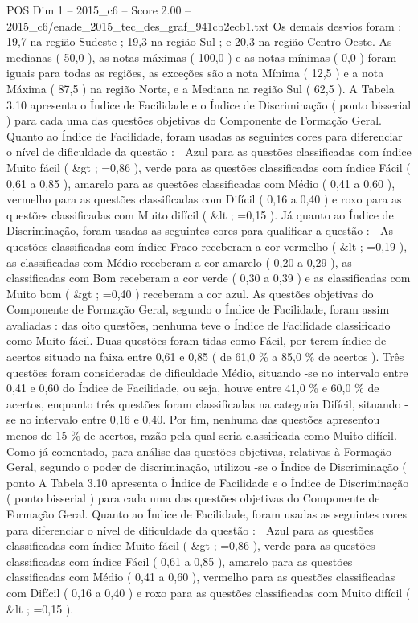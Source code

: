 \begin{textsample}{POS Dim 1 – 2015\_c6 – Score 2.00 – 2015\_c6/enade\_2015\_tec\_des\_graf\_941cb2ecb1.txt}
Os demais desvios foram : 19,7 na região Sudeste ; 19,3 na região Sul ; e 20,3 na região Centro-Oeste.
As medianas ( 50,0 ), as notas máximas ( 100,0 ) e as notas mínimas ( 0,0 ) foram iguais para todas as regiões, as exceções são a nota Mínima ( 12,5 ) e a nota Máxima ( 87,5 ) na região Norte, e a Mediana na região Sul ( 62,5 ).
A Tabela 3.10 apresenta o Índice de Facilidade e o Índice de Discriminação ( ponto bisserial ) para cada uma das questões objetivas do Componente de Formação Geral.
Quanto ao Índice de Facilidade, foram usadas as seguintes cores para diferenciar o nível de dificuldade da questão :  Azul para as questões classificadas com índice Muito fácil ( \&gt ; =0,86 ), verde para as questões classificadas com índice Fácil ( 0,61 a 0,85 ), amarelo para as questões classificadas com Médio ( 0,41 a 0,60 ), vermelho para as questões classificadas com Difícil ( 0,16 a 0,40 ) e roxo para as questões classificadas com Muito difícil ( \&lt ; =0,15 ).
Já quanto ao Índice de Discriminação, foram usadas as seguintes cores para qualificar a questão :  As questões classificadas com índice Fraco receberam a cor vermelho ( \&lt ; =0,19 ), as classificadas com Médio receberam a cor amarelo ( 0,20 a 0,29 ), as classificadas com Bom receberam a cor verde ( 0,30 a 0,39 ) e as classificadas com Muito bom ( \&gt ; =0,40 ) receberam a cor azul.
As questões objetivas do Componente de Formação Geral, segundo o Índice de Facilidade, foram assim avaliadas : das oito questões, nenhuma teve o Índice de Facilidade classificado como Muito fácil.
Duas questões foram tidas como Fácil, por terem índice de acertos situado na faixa entre 0,61 e 0,85 ( de 61,0 \% a 85,0 \% de acertos ).
Três questões foram consideradas de dificuldade Médio, situando -se no intervalo entre 0,41 e 0,60 do Índice de Facilidade, ou seja, houve entre 41,0 \% e 60,0 \% de acertos, enquanto três questões foram classificadas na categoria Difícil, situando -se no intervalo entre 0,16 e 0,40.
Por fim, nenhuma das questões apresentou menos de 15 \% de acertos, razão pela qual seria classificada como Muito difícil.
Como já comentado, para análise das questões objetivas, relativas à Formação Geral, segundo o poder de discriminação, utilizou -se o Índice de Discriminação ( ponto A Tabela 3.10 apresenta o Índice de Facilidade e o Índice de Discriminação ( ponto bisserial ) para cada uma das questões objetivas do Componente de Formação Geral.
Quanto ao Índice de Facilidade, foram usadas as seguintes cores para diferenciar o nível de dificuldade da questão :  Azul para as questões classificadas com índice Muito fácil ( \&gt ; =0,86 ), verde para as questões classificadas com índice Fácil ( 0,61 a 0,85 ), amarelo para as questões classificadas com Médio ( 0,41 a 0,60 ), vermelho para as questões classificadas com Difícil ( 0,16 a 0,40 ) e roxo para as questões classificadas com Muito difícil ( \&lt ; =0,15 ).

\end{textsample}
